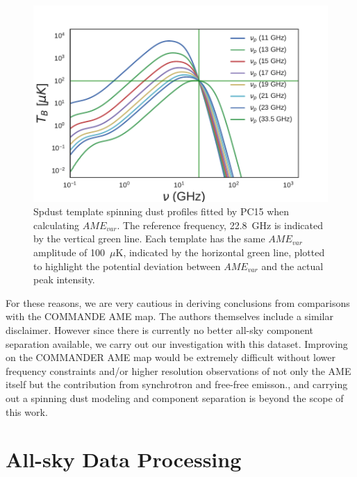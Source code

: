         \begin{figure}
          \label{fig:AME_commander_freqshift_templ}
          \includegraphics[width=\textwidth]{../Plots/ch_datasources/AME_commander_freqshift_templ.pdf}
          \centering
          \caption{Spdust template spinning dust profiles fitted by PC15 when calculating $AME_{var}$.  The reference frequency, 22.8~GHz is indicated by the vertical green line. Each template has the same $AME_{var}$ amplitude of 100~$\mu$K, indicated by the horizontal green line, plotted to highlight the potential deviation between $AME_{var}$ and the actual peak intensity. }
        \end{figure}

        For these reasons, we are very cautious in deriving conclusions from comparisons with the COMMANDE AME map. The authors themselves include a similar disclaimer. However since there is currently no better all-sky component separation available, we carry out our investigation with this dataset. Improving on the COMMANDER AME map would be extremely difficult without lower frequency constraints and/or higher resolution observations of not only the AME itself but the contribution from synchrotron and free-free emisson., and carrying out a spinning dust modeling and component separation is beyond the scope of this work.


  \section{All-sky Data Processing}

